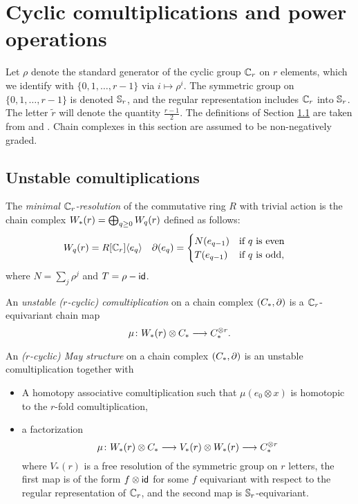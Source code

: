 \section{Cyclic comultiplications and power operations} \label{s:2bcomultiplications}

Let $\rho$ denote the standard generator of the cyclic group $\Cyc_r$ on $r$ elements, which we identify with $\{0,1,\ldots,r-1\}$ via $i\mapsto \rho^i$. The symmetric group on $\{0,1,\ldots,r-1\}$ is denoted $\Sym_r$, and the regular representation includes $\Cyc_r$ into $\Sym_r$. The letter $\tilde{r}$ will denote the quantity $\frac{r-1}{2}$. The definitions of Section \ref{s:unstable} are taken from \cite{may1970general} and \cite{medina2021may_st}. Chain complexes in this section are assumed to be non-negatively graded.

\subsection{Unstable comultiplications}\label{s:unstable}

The \emph{minimal $\Cyc_r$-resolution} of the commutative ring $R$ with trivial action is the chain complex $\W(r) = \bigoplus_{q\geq 0} \W[q](r)$ defined as follows:
\begin{align*}
	\W[q](r) &= R[\Cyc_r]\langle e_q\rangle  &
	\partial(e_q) &= \begin{cases}
		N(e_{q-1}) & \text{if $q$ is even} \\
		T(e_{q-1}) & \text{if $q$ is odd,}
	\end{cases}
\end{align*}
where $N = \sum_j \rho^j$ and $T = \rho - \Id$.

\begin{definition} An \emph{unstable ($r$-cyclic) comultiplication} on a chain complex $(\ucadenas,\partial)$ is a $\Cyc_r$-equivariant chain map
\[\mu\colon \W(r)\otimes \ucadenas\lra \ucadenas^{\otimes r}.\]
\end{definition}

\begin{definition}
	An \emph{($r$-cyclic) May structure} on a chain complex $(\ucadenas,\partial)$ is an unstable comultiplication together with
	\begin{itemize}
		\item A homotopy associative comultiplication such that $\mu(e_0\otimes x)$ is homotopic to the $r$-fold comultiplication,
		\item a factorization
	\[
		\mu\colon \W(r)\otimes \ucadenas\lra V_*(r)\otimes \W(r)\lra  \ucadenas^{\otimes r}
	\]
where $V_*(r)$ is a free resolution of the symmetric group on $r$ letters, the first map is of the form $f\otimes \id$ for some $f$ equivariant with respect to the regular representation of $\Cyc_r$, and the second map is $\Sym_r$-equivariant.
	\end{itemize}
\end{definition}


